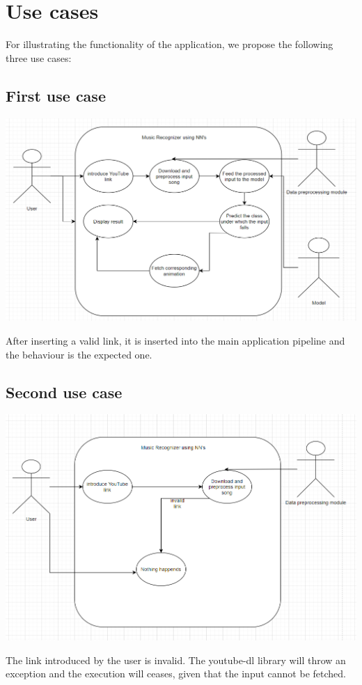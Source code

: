 \chapter{Use cases}

For illustrating the functionality of the application, we propose the following three use cases:

\section{First use case}

\begin{center}
	\centering
	\includegraphics[width = 5.5in]{images/usecase1.png}
	\centerline{}
	\label{uc1}
	\end{center}
After inserting a valid link, it is inserted into the main application pipeline and the
behaviour is the expected one.
\section{Second use case}
\begin{center}
	\centering
	\includegraphics[width = 5.5in]{images/usecase3.png}
	\centerline{}
	\label{uc3}
	\end{center}
The link introduced by the user is invalid. The youtube-dl library will throw an exception and the execution will ceases, given that the input cannot be fetched.

